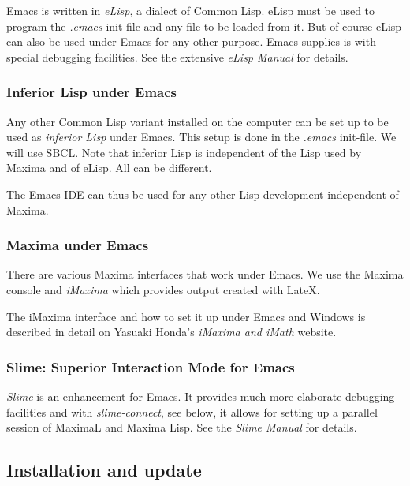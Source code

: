 \documentclass[../Maxima_Workbook.tex]{subfiles}
\begin{document}
Emacs is written in \emph{eLisp}, a dialect of Common Lisp. eLisp must be used to program the \emph{.emacs} init file and any file to be loaded from it. But of course eLisp can also be used under Emacs for any other purpose. Emacs supplies is with special debugging facilities. See the extensive \emph{eLisp Manual} for details.

\subsubsection{Inferior Lisp under Emacs}

Any other Common Lisp variant installed on the computer can be set up to be used as \emph{inferior Lisp} under Emacs. This setup is done in the \emph{.emacs} init-file. We will use SBCL. Note that inferior Lisp is independent of the Lisp used by Maxima and of eLisp. All can be different.

\lz The Emacs IDE can thus be used for any other Lisp development independent of Maxima.

\subsubsection{Maxima under Emacs}

There are various Maxima interfaces that work under Emacs. We use the Maxima console and \emph{iMaxima} which provides output created with LateX.

\lz The iMaxima interface and how to set it up under Emacs and Windows is described in detail on Yasuaki Honda's \emph{iMaxima and iMath} website.

\subsubsection{Slime: Superior Interaction Mode for Emacs}

\emph{Slime} is an enhancement for Emacs. It provides much more elaborate debugging facilities and with \emph{slime-connect}, see below, it allows for setting up a parallel session of MaximaL and Maxima Lisp. See the \emph{Slime Manual} for details.

\subsection{Installation and update}
\end{document}
